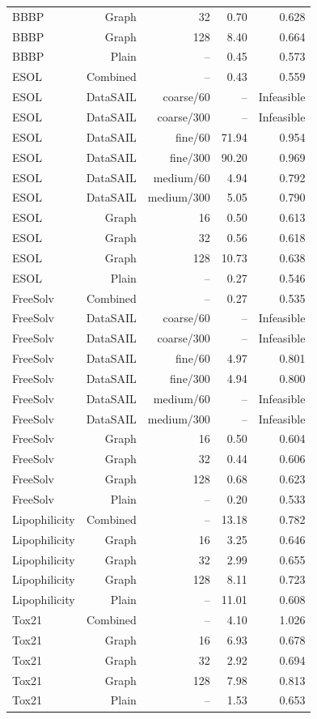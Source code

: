 \begin{longtable}{lrrrr}
BBBP & Graph & 32 & 0.70 & 0.628\\
BBBP & Graph & 128 & 8.40 & 0.664\\
BBBP & Plain & -- & 0.45 & 0.573\\
ESOL & Combined & -- & 0.43 & 0.559\\
ESOL & DataSAIL & coarse/60 & -- & Infeasible\\
ESOL & DataSAIL & coarse/300 & -- & Infeasible\\
ESOL & DataSAIL & fine/60 & 71.94 & 0.954\\
ESOL & DataSAIL & fine/300 & 90.20 & 0.969\\
ESOL & DataSAIL & medium/60 & 4.94 & 0.792\\
ESOL & DataSAIL & medium/300 & 5.05 & 0.790\\
ESOL & Graph & 16 & 0.50 & 0.613\\
ESOL & Graph & 32 & 0.56 & 0.618\\
ESOL & Graph & 128 & 10.73 & 0.638\\
ESOL & Plain & -- & 0.27 & 0.546\\
FreeSolv & Combined & -- & 0.27 & 0.535\\
FreeSolv & DataSAIL & coarse/60 & -- & Infeasible\\
FreeSolv & DataSAIL & coarse/300 & -- & Infeasible\\
FreeSolv & DataSAIL & fine/60 & 4.97 & 0.801\\
FreeSolv & DataSAIL & fine/300 & 4.94 & 0.800\\
FreeSolv & DataSAIL & medium/60 & -- & Infeasible\\
FreeSolv & DataSAIL & medium/300 & -- & Infeasible\\
FreeSolv & Graph & 16 & 0.50 & 0.604\\
FreeSolv & Graph & 32 & 0.44 & 0.606\\
FreeSolv & Graph & 128 & 0.68 & 0.623\\
FreeSolv & Plain & -- & 0.20 & 0.533\\
Lipophilicity & Combined & -- & 13.18 & 0.782\\
Lipophilicity & Graph & 16 & 3.25 & 0.646\\
Lipophilicity & Graph & 32 & 2.99 & 0.655\\
Lipophilicity & Graph & 128 & 8.11 & 0.723\\
Lipophilicity & Plain & -- & 11.01 & 0.608\\
Tox21 & Combined & -- & 4.10 & 1.026\\
Tox21 & Graph & 16 & 6.93 & 0.678\\
Tox21 & Graph & 32 & 2.92 & 0.694\\
Tox21 & Graph & 128 & 7.98 & 0.813\\
Tox21 & Plain & -- & 1.53 & 0.653\\
\end{longtable}
